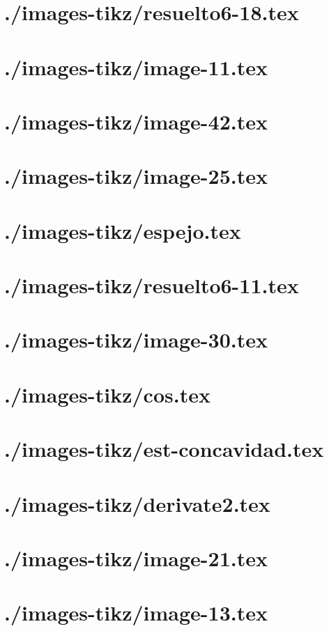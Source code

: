 \documentclass[]{article}
\begin{document}
\section{./images-tikz/resuelto6-18.tex} 
\section{./images-tikz/image-11.tex} 
\section{./images-tikz/image-42.tex} 
\section{./images-tikz/image-25.tex} 
\section{./images-tikz/espejo.tex} 
\section{./images-tikz/resuelto6-11.tex} 
\section{./images-tikz/image-30.tex} 
\section{./images-tikz/cos.tex} 
\section{./images-tikz/est-concavidad.tex} 
\section{./images-tikz/derivate2.tex} 
\section{./images-tikz/image-21.tex} 
\section{./images-tikz/image-13.tex} 
\end{document}
